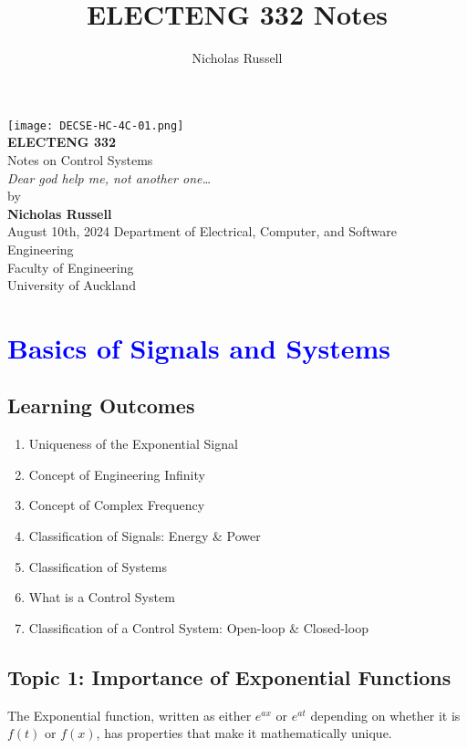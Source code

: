 \documentclass[a4paper,12pt]{report}
\title{ELECTENG 332 Notes}
\author{Nicholas Russell}
\begin{document}
\pagestyle{plain}
\begin{titlepage}
    \centering
    \texttt{[image: DECSE-HC-4C-01.png]}\\[1cm] %
    {\LARGE \textbf{ELECTENG 332}}\\[0.5cm]
    {\Large Notes on Control Systems}\\[0.5cm]
    {\textit{Dear god help me, not another one\dots\ }}\\[2cm]
    {\large by}\\[0.3cm]
    {\large \textbf{Nicholas Russell}}\\[1.4cm]
    {\large August 10th, 2024}
    \vfill %
    {\large Department of Electrical, Computer, and Software Engineering}\\[0.3cm]
    {\large Faculty of Engineering}\\[0.3cm]
    {\large University of Auckland}
\end{titlepage}
\tableofcontents
\newpage
\chapter{\textcolor{blue}{Basics of Signals and Systems}}
\section*{Learning Outcomes}
\begin{enumerate}[label=\blacktriangleright, leftmargin=*, itemsep=0.5em]
    \item Uniqueness of the Exponential Signal
    \item Concept of Engineering Infinity
    \item Concept of Complex Frequency
    \item Classification of Signals: Energy \& Power
    \item Classification of Systems
    \item What is a Control System
    \item Classification of a Control System: Open-loop \& Closed-loop
\end{enumerate}
\newpage
\section{Topic 1: Importance of Exponential Functions}
The Exponential function, written as either
\(e^{ax}\) or \(e^{at}\) depending on whether it is \(f(t)\) or \(f(x)\),
has properties that make it mathematically unique.
\end{document}
